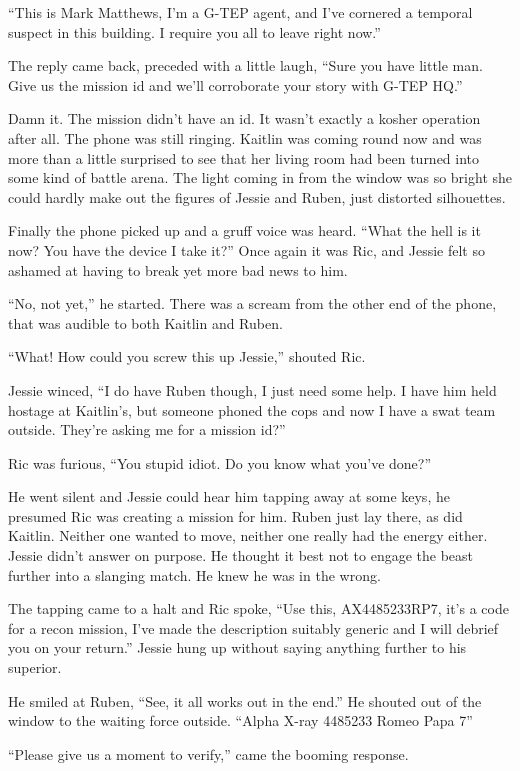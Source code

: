 ``This is Mark Matthews, I'm a G-TEP agent, and I've cornered a temporal suspect in this building.  I require you all to leave right now.''

The reply came back, preceded with a little laugh, ``Sure you have little man.  Give us the mission id and we'll corroborate your story with G-TEP HQ.''

Damn it.  The mission didn't have an id.  It wasn't exactly a kosher operation after all.  The phone was still ringing.  Kaitlin was coming round now and was more than a little surprised to see that her living room had been turned into some kind of battle arena.  The light coming in from the window was so bright she could hardly make out the figures of Jessie and Ruben, just distorted silhouettes.

Finally the phone picked up and a gruff voice was heard.  ``What the hell is it now?  You have the device I take it?''  Once again it was Ric, and Jessie felt so ashamed at having to break yet more bad news to him.

``No, not yet,'' he started.  There was a scream from the other end of the phone, that was audible to both Kaitlin and Ruben.

``What!  How could you screw this up Jessie,'' shouted Ric.

Jessie winced, ``I do have Ruben though, I just need some help.  I have him held hostage at Kaitlin's, but someone phoned the cops and now I have a swat team outside.  They're asking me for a mission id?''

Ric was furious, ``You stupid idiot.  Do you know what you've done?''

He went silent and Jessie could hear him tapping away at some keys, he presumed Ric was creating a mission for him.  Ruben just lay there, as did Kaitlin.  Neither one wanted to move, neither one really had the energy either.  Jessie didn't answer on purpose.  He thought it best not to engage the beast further into a slanging match.  He knew he was in the wrong.

The tapping came to a halt and Ric spoke, ``Use this, AX4485233RP7, it's a code for a recon mission, I've made the description suitably generic and I will debrief you on your return.''  Jessie hung up without saying anything further to his superior.  

He smiled at Ruben, ``See, it all works out in the end.''  He shouted out of the window to the waiting force outside.  ``Alpha X-ray 4485233 Romeo Papa 7''

``Please give us a moment to verify,'' came the booming response.  

